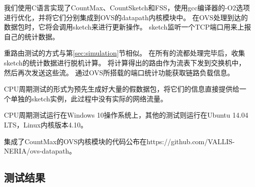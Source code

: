 我们使用C语言实现了CountMax、CountSketch和FSS，使用gcc编译器\cite{gcc}的-O2选项进行优化，并将它们分别集成到OVS的datapath内核模块中。
在OVS处理到达的数据包时，它将会调用sketch来进行更新操作。
sketch监听一个TCP端口用来上报自己的统计数据。

重路由测试的方式与第\ref{sec:simulation}节相似。
在所有的流都处理完毕后，收集sketch的统计数据进行脱机计算。
将计算得出的路由作为流表下发到交换机中，然后再次发送这些流。
通过OVS所搭载的端口统计功能获取链路负载信息。

CPU周期测试的形式为预先生成好大量的假数据包，将它们的信息直接提供给一个单独的sketch实例，此过程中没有实际的网络流量。

CPU周期测试运行在Windows 10操作系统上，其他的测试则运行在Ubuntu 14.04 LTS，Linux内核版本4.10。

集成了CountMax的OVS内核模块的代码公布在https://github.com/VALLIS-NERIA/ovs-datapath。
 
\subsection{测试结果}

